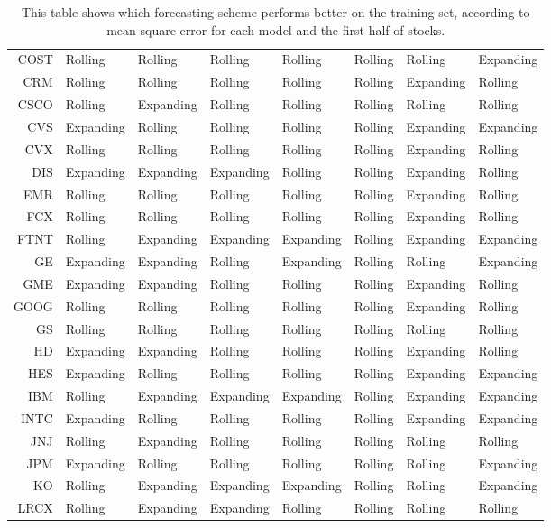 \begin{table}[ht]
\begin{tabular}{rlllllll}
  COST & Rolling & Rolling & Rolling & Rolling & Rolling & Rolling & Expanding \\ 
  CRM & Rolling & Rolling & Rolling & Rolling & Rolling & Expanding & Rolling \\ 
  CSCO & Rolling & Expanding & Rolling & Rolling & Rolling & Rolling & Rolling \\ 
  CVS & Expanding & Rolling & Rolling & Rolling & Rolling & Expanding & Expanding \\ 
  CVX & Rolling & Rolling & Rolling & Rolling & Rolling & Expanding & Rolling \\ 
  DIS & Expanding & Expanding & Expanding & Rolling & Rolling & Expanding & Rolling \\ 
  EMR & Rolling & Rolling & Rolling & Rolling & Rolling & Expanding & Rolling \\ 
  FCX & Rolling & Rolling & Rolling & Rolling & Rolling & Expanding & Rolling \\ 
  FTNT & Rolling & Expanding & Expanding & Expanding & Rolling & Expanding & Expanding \\ 
  GE & Expanding & Expanding & Rolling & Expanding & Rolling & Rolling & Expanding \\ 
  GME & Expanding & Expanding & Rolling & Rolling & Rolling & Expanding & Rolling \\ 
  GOOG & Rolling & Rolling & Rolling & Rolling & Rolling & Expanding & Rolling \\ 
  GS & Rolling & Rolling & Rolling & Rolling & Rolling & Rolling & Rolling \\ 
  HD & Expanding & Expanding & Rolling & Rolling & Rolling & Expanding & Rolling \\ 
  HES & Expanding & Rolling & Rolling & Rolling & Rolling & Expanding & Expanding \\ 
  IBM & Rolling & Expanding & Expanding & Expanding & Rolling & Expanding & Expanding \\ 
  INTC & Expanding & Rolling & Rolling & Rolling & Rolling & Expanding & Expanding \\ 
  JNJ & Rolling & Expanding & Rolling & Rolling & Rolling & Rolling & Rolling \\ 
  JPM & Expanding & Rolling & Rolling & Rolling & Rolling & Rolling & Expanding \\ 
  KO & Rolling & Expanding & Expanding & Expanding & Rolling & Rolling & Expanding \\ 
  LRCX & Rolling & Expanding & Expanding & Rolling & Rolling & Rolling & Rolling \\ 
   \hline
\end{tabular}
\caption[Better scheme MSE (1)]{This table shows which forecasting scheme performs better on the training set, according to mean square error 
              for each model and the first half of stocks.} 
\label{Table:Better_MSE_1}
\end{table}
